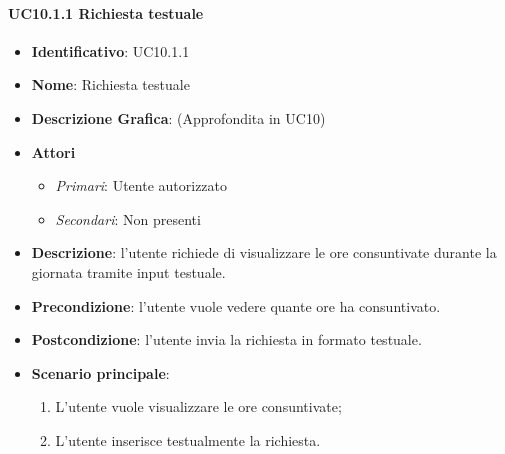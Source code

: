 \paragraph{UC10.1.1 Richiesta testuale}
\begin{itemize}
	\item \textbf{Identificativo}: UC10.1.1
	\item \textbf{Nome}: Richiesta testuale
	\item \textbf{Descrizione Grafica}: (Approfondita in UC10)
	\item \textbf{Attori}
	\begin{itemize}
		\item \textit{Primari}: Utente autorizzato
		\item \textit{Secondari}: Non presenti
	\end{itemize}
	\item \textbf{Descrizione}: l'utente richiede di visualizzare le ore consuntivate durante la giornata tramite input testuale.
	\item \textbf{Precondizione}: l'utente vuole vedere quante ore ha consuntivato.
	\item \textbf{Postcondizione}: l'utente invia la richiesta in formato testuale.
	\item \textbf{Scenario principale}: 
	\begin{enumerate}
		\item L'utente vuole visualizzare le ore consuntivate;
		\item L'utente inserisce testualmente la richiesta.
	\end{enumerate}
\end{itemize}

